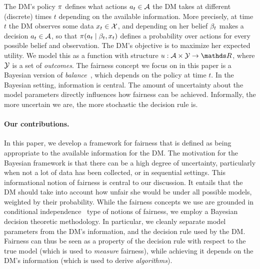 The DM's policy $\pi$ defines what actions $a_t \in \mathcal{A}$ the DM
takes at different (discrete) times $t$ depending on the available
information. More precisely, at time $t$ the DM observes some data
$x_t \in \mathcal{X}$, and depending on her belief $\beta_t$ makes a
decision $a_t \in \mathcal{A}$, so that $\pi(a_t \mid \beta_t, x_t)$
defines a probability over actions for every possible belief and
observation.  The DM's objective is to maximize her expected
utility. We model this as a function with structure $\util : \Act
\times \Out \to \Reals$, where $\mathcal{Y}$ is a set of \emph{outcomes}.
The fairness concept we focus on in this paper is a Bayesian version
of {\em balance}~\citep{kleinberg2016inherent}, which depends on the
policy at time $t$.  In the Bayesian setting, information is
central. The amount of uncertainty about the model parameters directly
influences how fairness can be achieved. Informally, the more
uncertain we are, the more stochastic the decision rule is.

\paragraph{Our contributions.} In this paper, we develop a framework for fairness that is defined as being
appropriate to the available information for the DM. The motivation for the Bayesian framework is that there can be a high degree of uncertainty, particularly when not a lot of data has been collected, or in sequential settings. This
informational notion of fairness is central to our discussion. It
entails that the DM should take into account how unfair she would be
under all possible models, weighted by their probability. While the
fairness concepts we use are grounded in conditional
independence~\citep{chouldechova2016fair,kleinberg2016inherent,HardtPNS16} type of
notions of fairness, we employ a Bayesian decision theoretic methodology. In particular, we cleanly separate model parameters from the DM's information, and the decision rule used by the DM. Fairness can thus be seen as a property of the decision rule with respect to the true model (which is used to \emph{measure} fairness), while
achieving it depends
on the DM's information (which is used to derive \emph{algorithms}).

